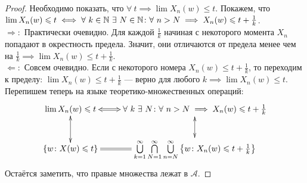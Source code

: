 \begin{proof}
    Необходимо показать, что $\forall ~ t \implies \lim X_n(w) \leq t$. Покажем, что $\lim X_n(w) \leqslant t
    \iff \forall ~ k \in \mathbb{N} ~ \exists ~ N \in \mathbb{N} \colon \forall ~ n > N \implies X_n(w) \leqslant t + \frac{1}{k}$.\\
    $\Rightarrow \colon$ Практически очевидно. Для каждой $\frac{1}{k}$ начиная с некоторого момента $X_n$ попадают
    в окрестность предела. Значит, они отличаются от предела менее чем на $\frac{1}{k} \implies \lim X_n(w) \leq t + \frac{1}{k}$.\\
    $\Leftarrow \colon$ Совсем очевидно. Если с некоторого номера $X_n(w) \leq t + \frac{1}{k}$, то переходим к пределу:
    $\lim X_n(w) \leq t + \frac{1}{k}$ --- верно для любого $k \implies \lim X_n(w) \leq t$.\\
    Перепишем теперь на языке теоретико-множественных операций:
    \[
        \xymatrix{
        {\lim X_n(w) \leq t}\ar@{<=>}[r]\ar@{<->}[d] & {\forall ~ k ~ \exists ~ N \colon \forall ~ n > N \implies X_n(w) \leq t + \frac{1}{k}}\ar@{<->}[d]\\
        {\{w \colon X(w) \leq t\}} \ar@{=}[r]& {\bigcup\limits_{k=1}^{\infty}\bigcap\limits_{N=1}^{\infty}\bigcup\limits_{n=N}^{\infty}
        \left\{w \colon X_n(w) \leq t + \frac{1}{k}\right\}}
        }
    \]
    Остаётся заметить, что правые множества лежат в $\mathcal{A}$.
\end{proof}
\begin{comment}
    Объясняю переход от выражения в кванторах к теоретико-множественной записи: рассмотрим ту же запись, и покажем для парочки
    кванторов. Итак, работаем с записью $\forall ~ k ~ \exists ~ N \colon \forall ~ n > N \implies X_n(w) \leq t + \frac{1}{k}$.
    Логично, что чтобы учесть квантор $\forall ~ k \in \NN$, нужно объединить все множества для всевозможных $k$:
    $\bigcup\limits_{k=1}^{\infty}\left\{w \colon X_n(w) \leq t + \frac{1}{k}\right\}$. Аналогично, чтобы учесть квантор
    существования $\exists ~ N \in \NN$, нужно пересечь все множества для всевозможных $N$:
    $\bigcap\limits_{N=1}^{\infty}\left\{w \colon X_n(w) \leq t + \frac{1}{k}\right\}$. Далее это превращается просто в
    конструктор.
\end{comment}

